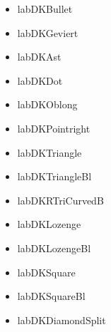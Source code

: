 \documentclass[a4paper]{article}%
\begin{document}
\begin{itemize}[labDKBullet]
\item%
    labDKBullet
\end{itemize}
\begin{itemize}[labDKGeviert]
\item%
    labDKGeviert
\end{itemize}
\begin{itemize}[labDKAst]
\item%
    labDKAst
\end{itemize}
\begin{itemize}[labDKDot]
\item%
    labDKDot
\end{itemize}
\begin{itemize}[labDKOblong]
\item%
    labDKOblong
\end{itemize}
\begin{itemize}[labDKPointright]
\item%
    labDKPointright
\end{itemize}
\begin{itemize}[labDKTriangle]
\item%
    labDKTriangle
\end{itemize}
\begin{itemize}[labDKTriangleBl]
\item%
    labDKTriangleBl
\end{itemize}
\begin{itemize}[labDKRTriCurvedB]
\item%
    labDKRTriCurvedB
\end{itemize}
\begin{itemize}[labDKLozenge]
\item%
    labDKLozenge
\end{itemize}
\begin{itemize}[labDKLozengeBl]
\item%
    labDKLozengeBl
\end{itemize}
\begin{itemize}[labDKSquare]
\item%
    labDKSquare
\end{itemize}
\begin{itemize}[labDKSquareBl]
\item%
    labDKSquareBl
\end{itemize}
\begin{itemize}[labDKDiamondSplit]
\item%
    labDKDiamondSplit
\end{itemize}
\end{document}
